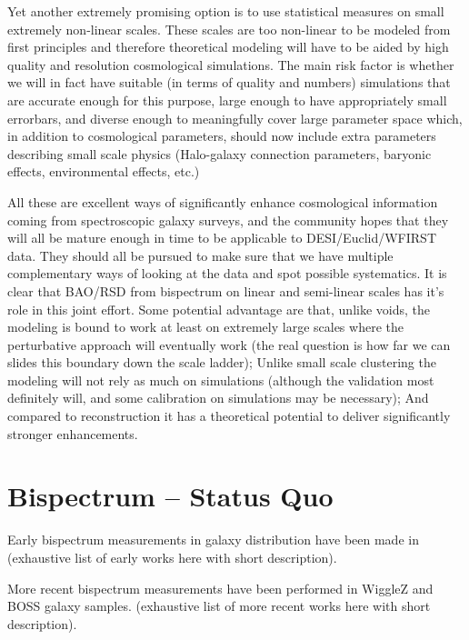 Yet another extremely promising option is to use statistical measures on small
extremely non-linear scales. These scales are too non-linear to be modeled from
first principles and therefore theoretical modeling will have to be aided by
high quality and resolution cosmological simulations. The main risk factor is
whether we will in fact have suitable (in terms of quality and numbers)
simulations that are accurate enough for this purpose, large enough to have
appropriately small errorbars, and diverse enough to meaningfully cover large
parameter space which, in addition to cosmological parameters, should now
include extra parameters describing small scale physics (Halo-galaxy connection
parameters, baryonic effects, environmental effects, etc.)

All these are excellent ways of significantly enhance cosmological information
coming from spectroscopic galaxy surveys, and the community hopes that they
will all be mature enough in time to be applicable to DESI/Euclid/WFIRST data.
They should all be pursued to make sure that we have multiple complementary
ways of looking at the data and spot possible systematics. It is clear that
BAO/RSD from bispectrum on linear and semi-linear scales has it's role in this
joint effort. Some potential advantage are that, unlike voids, the modeling is
bound to work at least on extremely large scales where the perturbative
approach will eventually work (the real question is how far we can slides this
boundary down the scale ladder); Unlike small scale clustering the modeling
will not rely as much on simulations (although the validation most definitely
will, and some calibration on simulations may be necessary); And compared to
reconstruction it has a theoretical potential to deliver significantly stronger
enhancements.

\section{Bispectrum -- Status Quo}

Early bispectrum measurements in galaxy distribution have been made in
(exhaustive list of early works here with short description).

More recent bispectrum measurements have been performed in WiggleZ and BOSS
galaxy samples. (exhaustive list of more recent works here with short
description).

